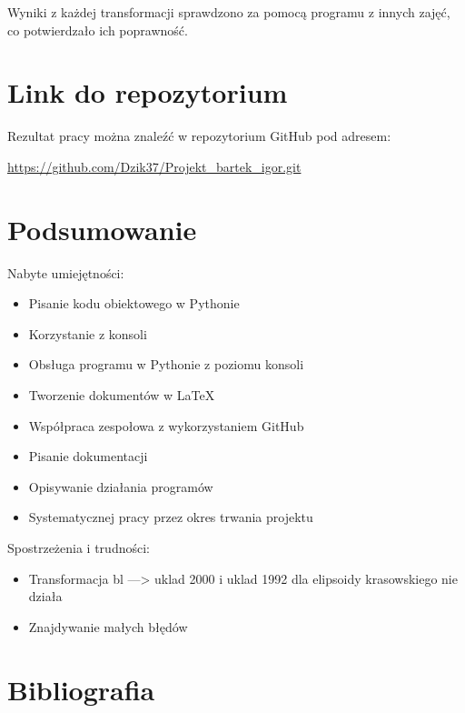 \documentclass[11pt, a4paper]{article}
\begin{document}
	 Wyniki z każdej transformacji sprawdzono za pomocą programu z innych zajęć, co potwierdzało ich poprawność.
	
	\section{Link do repozytorium}
	Rezultat pracy można znaleźć w repozytorium GitHub pod adresem:
	
	 \url{https://github.com/Dzik37/Projekt_bartek_igor.git}
	
	\section{Podsumowanie}
	Nabyte umiejętności:
	\begin{itemize}
		\item Pisanie kodu obiektowego w Pythonie
		\item Korzystanie z konsoli 
		\item Obsługa programu w Pythonie z poziomu konsoli
		\item Tworzenie dokumentów w LaTeX
		\item Współpraca zespołowa z wykorzystaniem GitHub
		\item Pisanie dokumentacji
		\item Opisywanie działania programów 
		\item Systematycznej pracy przez okres trwania projektu
	\end{itemize}
	
	Spostrzeżenia i trudności:
	\begin{itemize}
		\item Transformacja bl ---> uklad 2000 i uklad 1992 dla elipsoidy krasowskiego nie działa
		\item Znajdywanie małych błędów
		
	\end{itemize}
	
	\section{Bibliografia}
	
	
\end{document}
